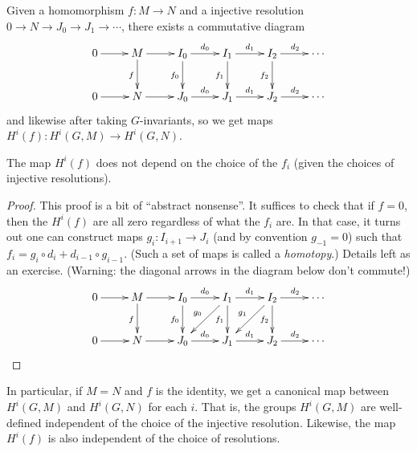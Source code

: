 Given a homomorphism $f: M \to N$ and a
injective resolution $0 \to N \to J_0 \to J_1 \to \cdots$, there exists a
commutative diagram
\[
\xymatrix{ 0 \ar[r] & M \ar[r] \ar_f[d] & I_0 \ar^{d_0}[r] \ar_{f_0}[d] &
 I_1  \ar_{f_1}[d] \ar^{d_1}[r] & I_2 \ar_{f_2}[d] \ar^{d_2}[r] &
\cdots \\
0 \ar[r] & N \ar[r] & J_0 \ar^{d_0}[r] & J_1 \ar^{d_1}[r] & 
J_2 \ar^{d_2}[r] &
\cdots
}
\]
and likewise after taking $G$-invariants, so we get maps
$H^i(f): H^i(G, M) \to H^i(G, N)$.
\begin{lemma} \label{L:injective resolutions to cohomology maps}
The map $H^i(f)$ does not depend
on the choice of the $f_i$ (given the choices
of injective resolutions).
\end{lemma}
\begin{proof}
This proof is a bit of ``abstract nonsense''. It suffices to check that if
$f=0$, then the $H^i(f)$ are all zero regardless of what the $f_i$ are.
In that case, it turns out one can
construct maps $g_i: I_{i+1} \to J_i$ (and by convention $g_{-1} = 0$)
such that
$f_i = g_i \circ d_i  + d_{i-1} \circ g_{i-1}$. (Such a set of maps is
called a \emph{homotopy}.) Details left as an exercise. (Warning: the diagonal
arrows in the diagram below don't commute!)
\[
\xymatrix{ 0 \ar[r] & M \ar[r] \ar_f[d] & I_0 \ar^{d_0}[r] \ar_{f_0}[d] &
 I_1  \ar_{g_0}[dl] \ar_{f_1}[d] \ar^{d_1}[r] & \ar_{g_1}[dl] I_2 
\ar_{f_2}[d] \ar^{d_2}[r] &
\cdots \\
0 \ar[r] & N \ar[r] & J_0 \ar^{d_0}[r] & J_1 \ar^{d_1}[r] & 
J_2 \ar^{d_2}[r] &
\cdots
}
\]
\end{proof}
In particular, if $M=N$ and $f$ is the identity, we get a canonical map
between $H^i(G,M)$ and $H^i(G,N)$ for each $i$. That is, the groups
$H^i(G,M)$ are well-defined independent of the choice of the injective
resolution. Likewise, the map $H^i(f)$ is also independent of the choice
of resolutions.


